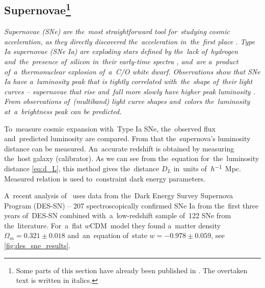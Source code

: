 \subsection[Supernovae]{Supernovae\footnote{\label{ftn1}Some parts of this section have already been published in \textcite{mastersthesis_vrastil}. The overtaken text is written in italics.}}
\label{ssec:supernovae}
{\itshape
Supernovae (SNe) are the~most straightforward tool for~studying cosmic acceleration, as they directly discovered the~acceleration in~the~first place \parencite{riess}. Type Ia supernovae (SNe Ia) are exploding stars defined by the~lack of~hydrogen and~the~presence of~silicon in~their early-time spectra \parencite{SN}, and~are a~product of~a~thermonuclear explosion of~a~C/O white dwarf. Observations show that SNe Ia have a~luminosity peak that is tightly correlated with~the~shape of~their light curves -- supernovae that rise and~fall more slowly have higher peak luminosity \parencite[first quantified by][]{SN_lum}. From observations of~(multiband) light curve shapes and~colors the~luminosity at~a~brightness peak can be predicted.

To~measure cosmic expansion with~Type Ia SNe, the~observed flux and~predicted luminosity are compared. From that the~supernova's luminosity distance can be measured. An~accurate redshift is obtained by measuring the~host galaxy (calibrator). As we can see from the~equation for~the~luminosity distance \eqref{eq:d_L}, this method gives the~distance $D_L$ in~units of~$h^{-1}$ Mpc. Measured relation is used to~constraint dark energy parameters.
}

A~recent analysis of~\textcite{Abbott_2019} uses data from the~Dark Energy Survey Supernova Program (DES-SN) -- 207 spectroscopically confirmed SNe Ia from the~first three years of~DES-SN combined with~a~low-redshift sample of~122 SNe from the~literature. For~a~flat $w$CDM\ model they found a~matter density $\Omega_m=0.321\pm0.018$ and~an~equation of~state $w=-0.978\pm0.059$, see \autoref{fig:des_sne_results}.

